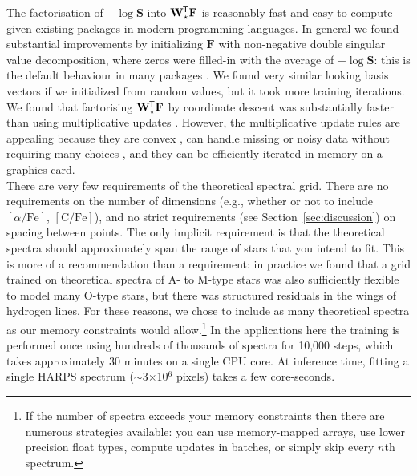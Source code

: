 \documentclass[modern,linenumbers]{aastex631}
\renewcommand{\vec}[1]{\mathbf{#1}}
\newcommand*{\transpose}{^{\mkern-1.5mu\mathsf{T}}}
\renewcommand{\added}[1]{#1}
\begin{document}
The factorisation of $-\log{\vec{S}}$ into $\vec{W}_\star\transpose\vec{F}$ is reasonably fast and easy to compute given existing packages in modern programming languages. In general we found substantial improvements by initializing $\vec{F}$ with non-negative double singular value decomposition, where zeros were filled-in with the average of $-\log{\vec{S}}$: this is the default behaviour in many packages \citep[e.g.,][]{scikit-learn}. We found very similar looking basis vectors if we initialized from random values, but it took more training iterations. We found that factorising $\vec{W}_\star\transpose\vec{F}$ by coordinate descent was substantially faster than using multiplicative updates \citep{Hsieh}. However, the multiplicative update rules are appealing because they are convex \citep{Lee_Seung:2000}, can handle missing or noisy data without requiring many choices \citep{Blanton:2007}, and they can be efficiently iterated in-memory on a graphics card.\\

There are very few requirements of the theoretical spectral grid. There are no requirements on the number of dimensions (e.g., whether or not to include $[\alpha/\mathrm{Fe}]$, $[\mathrm{C/Fe}]$), and no strict requirements (see Section~\ref{sec:discussion}) on spacing between points. The only implicit requirement is that the theoretical spectra should approximately span the range of stars that you intend to fit. This is more of a recommendation than a requirement: in practice we found that a grid trained on theoretical spectra of A- to M-type stars was also sufficiently flexible to model many O-type stars, but there was structured residuals in the wings of hydrogen lines. For these reasons, we chose to include as many theoretical spectra as our memory constraints would allow.\footnote{If the number of spectra exceeds your memory constraints then there are numerous strategies available: you can use memory-mapped arrays, use lower precision float types, compute updates in batches, or simply skip every $n$th spectrum.} \added{In the applications here the training is performed once using hundreds of thousands of spectra for 10,000 steps, which takes approximately 30 minutes on a single CPU core. At inference time, fitting a single HARPS spectrum ($\sim$3$\times$10$^6$ pixels) takes a few core-seconds.}\\
\end{document}
